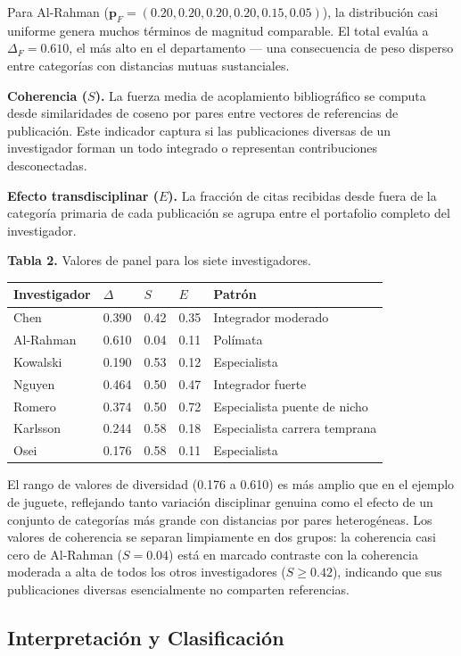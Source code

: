 \documentclass[
]{article}
\begin{document}
Para Al-Rahman
(\(\mathbf{p}_F = (0.20, 0.20, 0.20, 0.20, 0.15, 0.05)\)), la
distribución casi uniforme genera muchos términos de magnitud
comparable. El total evalúa a \(\Delta_F = 0.610\), el más alto en el
departamento --- una consecuencia de peso disperso entre categorías con
distancias mutuas sustanciales.

\textbf{Coherencia (\(S\)).} La fuerza media de acoplamiento
bibliográfico se computa desde similaridades de coseno por pares entre
vectores de referencias de publicación. Este indicador captura si las
publicaciones diversas de un investigador forman un todo integrado o
representan contribuciones desconectadas.

\textbf{Efecto transdisciplinar (\(E\)).} La fracción de citas recibidas
desde fuera de la categoría primaria de cada publicación se agrupa entre
el portafolio completo del investigador.

\textbf{Tabla 2.} Valores de panel para los siete investigadores.

\begin{longtable}[]{@{}lllll@{}}
\toprule
Investigador & \(\Delta\) & \(S\) & \(E\) & Patrón \\
\midrule
\endhead
Chen & 0.390 & 0.42 & 0.35 & Integrador moderado \\
Al-Rahman & 0.610 & 0.04 & 0.11 & Polímata \\
Kowalski & 0.190 & 0.53 & 0.12 & Especialista \\
Nguyen & 0.464 & 0.50 & 0.47 & Integrador fuerte \\
Romero & 0.374 & 0.50 & 0.72 & Especialista puente de nicho \\
Karlsson & 0.244 & 0.58 & 0.18 & Especialista carrera temprana \\
Osei & 0.176 & 0.58 & 0.11 & Especialista \\
\bottomrule
\end{longtable}

El rango de valores de diversidad (0.176 a 0.610) es más amplio que en
el ejemplo de juguete, reflejando tanto variación disciplinar genuina
como el efecto de un conjunto de categorías más grande con distancias
por pares heterogéneas. Los valores de coherencia se separan limpiamente
en dos grupos: la coherencia casi cero de Al-Rahman (\(S = 0.04\)) está
en marcado contraste con la coherencia moderada a alta de todos los
otros investigadores (\(S \geq 0.42\)), indicando que sus publicaciones
diversas esencialmente no comparten referencias.

\hypertarget{interpretaciuxf3n-y-clasificaciuxf3n}{%
\subsection{Interpretación y
Clasificación}\label{interpretaciuxf3n-y-clasificaciuxf3n}}
\end{document}
